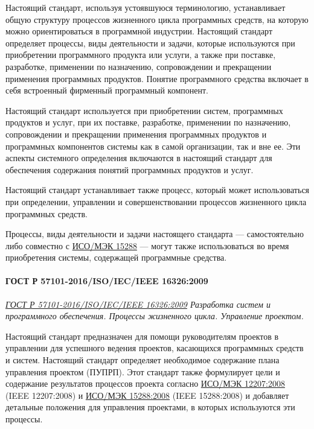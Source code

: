 Настоящий стандарт, используя устоявшуюся терминологию,
устанавливает общую структуру процессов жизненного цикла программных средств,
на которую можно ориентироваться в программной индустрии.
Настоящий стандарт определяет процессы, виды деятельности и задачи,
которые используются при приобретении программного продукта или услуги,
а также при поставке, разработке, применении по назначению,
сопровождении и прекращении применения программных продуктов.
Понятие программного средства включает
в себя встроенный фирменный программный компонент.

Настоящий стандарт используется при приобретении систем,
программных продуктов и услуг, при их поставке, разработке,
применении по назначению, сопровождении
и прекращении применения программных продуктов
и программных компонентов системы как в самой организации, так и вне ее.
Эти аспекты системного определения включаются в настоящий стандарт
для обеспечения содержания понятий программных продуктов и услуг.

Настоящий стандарт устанавливает также процесс,
который может использоваться при определении, управлении
и совершенствовании процессов жизненного цикла программных средств.

Процессы, виды деятельности и задачи настоящего стандарта
--- самостоятельно либо совместно с
\href{https://docs.cntd.ru/document/1200045267}{ИСО/МЭК 15288}
--- могут также использоваться во время приобретения системы,
содержащей программные средства.

\paragraph{ГОСТ Р 57101-2016/ISO/IEC/IEEE 16326:2009}

\emph{\href{https://docs.cntd.ru/document/1200139543}
{ГОСТ Р 57101-2016/ISO/IEC/IEEE 16326:2009}
Разработка систем и программного обеспечения.
Процессы жизненного цикла. Управление проектом.
}

Настоящий стандарт предназначен для помощи руководителям проектов
в управлении для успешного ведения проектов,
касающихся программных средств и систем.
Настоящий стандарт определяет необходимое содержание
плана управления проектом (ПУПРП).
Этот стандарт также формулирует цели и содержание результатов процессов
проекта согласно
\href{https://docs.cntd.ru/document/1200082859}{ИСО/МЭК 12207:2008}
(IEEE 12207:2008)
и \href{https://docs.cntd.ru/document/1200045267}{ИСО/МЭК 15288:2008}
(IEEE 15288:2008)
и добавляет детальные положения для управления проектами,
в которых используются эти процессы.

